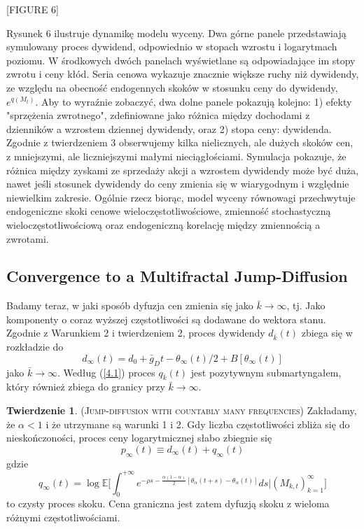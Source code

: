 \documentclass[12pt]{article}
\theoremstyle{definition}
\newtheorem{tw}{Twierdzenie}[section]
\begin{document}
\begin{center}
[FIGURE 6]
\end{center}

Rysunek 6 ilustruje dynamikę modelu wyceny. Dwa górne panele przedstawiają symulowany proces dywidend, odpowiednio w stopach wzrostu i logarytmach poziomu. W środkowych dwóch panelach wyświetlane są odpowiadające im stopy zwrotu i ceny kłód. Seria cenowa wykazuje znacznie większe ruchy niż dywidendy, ze względu na obecność endogennych skoków w stosunku ceny do dywidendy, $e^{q(M_t)}$. Aby to wyraźnie zobaczyć, dwa dolne panele pokazują kolejno: 1) efekty "sprzężenia zwrotnego", zdefiniowane jako różnica między dochodami z dzienników a wzrostem dziennej dywidendy, oraz 2) stopa ceny: dywidenda. Zgodnie z twierdzeniem 3 obserwujemy kilka nielicznych, ale dużych skoków cen, z mniejszymi, ale liczniejszymi małymi nieciągłościami. Symulacja pokazuje, że różnica między zyskami ze sprzedaży akcji a wzrostem dywidendy może być duża, nawet jeśli stosunek dywidendy do ceny zmienia się w wiarygodnym i względnie niewielkim zakresie. Ogólnie rzecz biorąc, model wyceny równowagi przechwytuje endogeniczne skoki cenowe wieloczęstotliwościowe, zmienność stochastyczną wieloczęstotliwościową oraz endogeniczną korelację między zmiennością a zwrotami.

\subsection{Convergence to a Multifractal Jump-Diffusion}

Badamy teraz, w jaki sposób dyfuzja cen zmienia się jako $\bar{k} \to \infty$, tj. Jako komponenty o coraz wyższej częstotliwości są dodawane do wektora stanu. Zgodnie z Warunkiem 2 i twierdzeniem 2, proces dywidendy $d_{\bar{k}}(t)$ zbiega się w rozkładzie do
$$d_{\infty}(t) = d_0 + \bar{g}_D t - \theta_{\infty}(t) / 2 + B [\theta_{\infty}(t)]$$
jako $\bar{k} \to \infty $. Według (\ref{4.1}) proces $q_{\bar{k}} (t)$ jest pozytywnym submartyngałem, który również zbiega do granicy przy $\bar{k} \to \infty$.
\begin{tw}{\textsc{(Jump-diffusion with countably many frequencies)}}
Zakładamy, że $\alpha<1$ i że utrzymane są warunki 1 i 2. Gdy liczba częstotliwości zbliża się do nieskończoności, proces ceny logarytmicznej słabo zbiegnie się
$$p_{\infty}(t) \equiv d_{\infty}(t) + q_{\infty}(t)$$
gdzie
$$q_{\infty}(t) = \log \mathbb{E} \Bigg[ \int_{0}^{+\infty} e^{- \rho s - \frac{\alpha(1 - \alpha)}{2} [\theta_{\alpha} (t+s) -\theta_{\alpha}(t)]}ds \Bigg| (M_{k,t})_{k=1}^{\infty} \Bigg]$$
to czysty proces skoku. Cena graniczna jest zatem dyfuzją skoku z wieloma różnymi częstotliwościami.
\end{tw}
\end{document}
